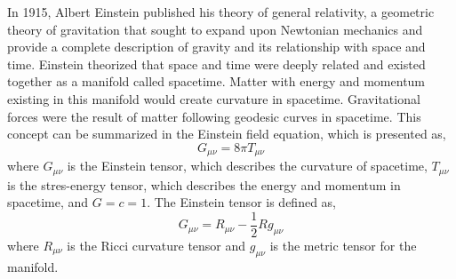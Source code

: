In 1915, Albert Einstein published his theory of general relativity, a 
geometric theory of gravitation that sought to expand upon Newtonian 
mechanics and provide a complete description of gravity and its 
relationship with space and time. Einstein theorized that space 
and time were deeply related and existed together as a manifold 
called spacetime. Matter with energy and momentum 
existing in this manifold would create 
curvature in spacetime. Gravitational forces were the result of 
matter following geodesic curves in spacetime. This concept can 
be summarized in the Einstein field equation, which is presented 
as,
\begin{equation}
G_{\mu\nu} = 8\pi T_{\mu\nu}
\label{eq:EFE}
\end{equation}
where $G_{\mu\nu}$ is the Einstein tensor, which describes the 
curvature of spacetime, $T_{\mu\nu}$ is the 
stres-energy tensor, which describes the energy and momentum in 
spacetime, and  $G=c=1$. The Einstein tensor is defined as,
\begin{equation}
G_{\mu\nu} = R_{\mu\nu} - \frac{1}{2}Rg_{\mu\nu}
\end{equation}
where $R_{\mu\nu}$ is the Ricci curvature tensor and $g_{\mu\nu}$ is 
the metric tensor for the manifold.

